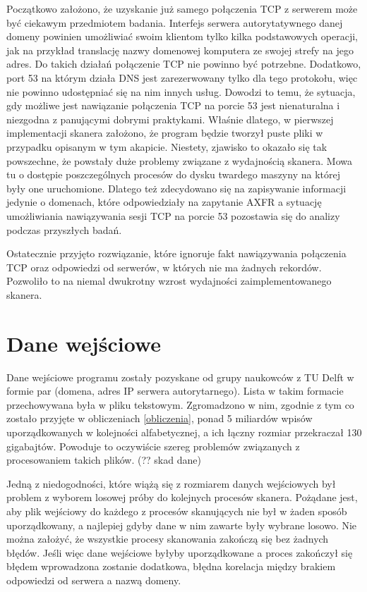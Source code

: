 Początkowo założono, że uzyskanie już samego połączenia TCP z serwerem może być ciekawym przedmiotem badania. Interfejs serwera
autorytatywnego danej domeny powinien umożliwiać swoim klientom tylko kilka podstawowych operacji, jak na przykład translację nazwy
domenowej komputera ze swojej strefy na jego adres. Do takich działań połączenie TCP nie powinno być potrzebne. Dodatkowo, port 53 na którym działa
DNS jest zarezerwowany tylko dla tego protokołu, więc nie powinno udostępniać się na nim innych usług. Dowodzi to temu, że sytuacja,
gdy możliwe jest nawiązanie połączenia TCP na porcie 53 jest nienaturalna i niezgodna z panującymi dobrymi praktykami. Właśnie dlatego,
w pierwszej implementacji skanera założono, że program będzie tworzył puste pliki w przypadku opisanym w tym akapicie. Niestety,
zjawisko to okazało się tak powszechne, że powstały duże problemy związane z wydajnością skanera. Mowa tu o dostępie poszczególnych
procesów do dysku twardego maszyny na której były one uruchomione. Dlatego też zdecydowano się na zapisywanie informacji jedynie o
domenach, które odpowiedziały na zapytanie AXFR a sytuację umożliwiania nawiązywania sesji TCP na porcie 53 pozostawia się do analizy
podczas przyszłych badań.

Ostatecznie przyjęto rozwiązanie, które ignoruje fakt nawiązywania połączenia TCP oraz odpowiedzi od serwerów, w których nie ma
żadnych rekordów. Pozwoliło to na niemal dwukrotny wzrost wydajności zaimplementowanego skanera.

\section{Dane wejściowe}
\label{inputData}
Dane wejściowe programu zostały pozyskane od grupy naukowców z TU Delft \cite{delft} w formie par (domena, adres IP serwera
autorytarnego). Lista w takim formacie przechowywana była w pliku tekstowym. Zgromadzono w nim, zgodnie z tym co zostało przyjęte
w obliczeniach \ref{obliczenia}, ponad 5 miliardów wpisów uporządkowanych w kolejności alfabetycznej, a ich łączny rozmiar przekraczał
130 gigabajtów. Powoduje to oczywiście szereg problemów związanych z procesowaniem takich plików. (?? skad dane)

Jedną z niedogodności, które wiążą się z rozmiarem danych wejściowych był problem z wyborem losowej próby do kolejnych procesów
skanera. Pożądane jest, aby plik wejściowy do każdego z procesów skanujących nie był w żaden sposób uporządkowany, a najlepiej
gdyby dane w nim zawarte były wybrane losowo. Nie można założyć, że wszystkie procesy skanowania zakończą się bez żadnych błędów.
Jeśli więc dane wejściowe byłyby uporządkowane a proces zakończył się błędem wprowadzona zostanie dodatkowa, błędna korelacja między
brakiem odpowiedzi od serwera a nazwą domeny.

